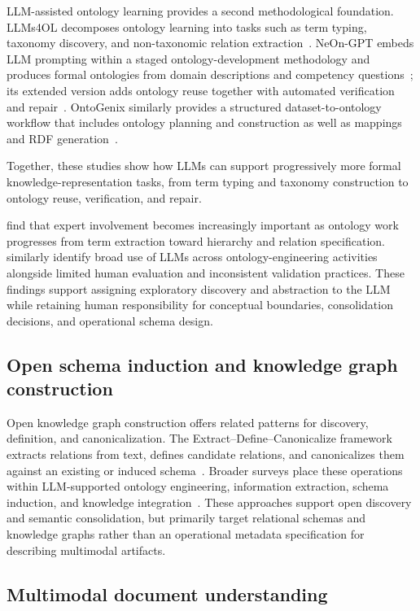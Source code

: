 \documentclass{article}
\begin{document}
LLM-assisted ontology learning provides a second methodological foundation. LLMs4OL decomposes ontology learning into tasks such as term typing, taxonomy discovery, and non-taxonomic relation extraction~\citep{giglou2023llms4ol}. NeOn-GPT embeds LLM prompting within a staged ontology-development methodology and produces formal ontologies from domain descriptions and competency questions~\citep{fathallah2025neongpt}; its extended version adds ontology reuse together with automated verification and repair~\citep{fathallah2026extended}. OntoGenix similarly provides a structured dataset-to-ontology workflow that includes ontology planning and construction as well as mappings and RDF generation~\citep{valcalvo2025ontogenix}.

Together, these studies show how LLMs can support progressively more formal knowledge-representation tasks, from term typing and taxonomy construction to ontology reuse, verification, and repair.

\cite{ding2026ontology} find that expert involvement becomes increasingly important as ontology work progresses from term extraction toward hierarchy and relation specification. \cite{li2026ontologyreview} similarly identify broad use of LLMs across ontology-engineering activities alongside limited human evaluation and inconsistent validation practices. These findings support assigning exploratory discovery and abstraction to the LLM while retaining human responsibility for conceptual boundaries, consolidation decisions, and operational schema design.

\subsection{Open schema induction and knowledge graph construction}

Open knowledge graph construction offers related patterns for discovery, definition, and canonicalization. The Extract--Define--Canonicalize framework extracts relations from text, defines candidate relations, and canonicalizes them against an existing or induced schema~\citep{zhang2024edc}. Broader surveys place these operations within LLM-supported ontology engineering, information extraction, schema induction, and knowledge integration~\citep{bian2025}. These approaches support open discovery and semantic consolidation, but primarily target relational schemas and knowledge graphs rather than an operational metadata specification for describing multimodal artifacts.

\subsection{Multimodal document understanding}
\end{document}
